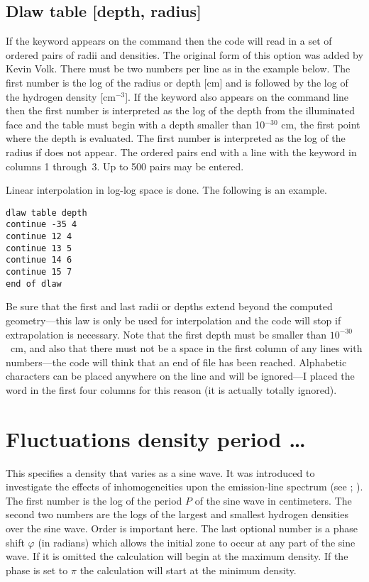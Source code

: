 \subsection{Dlaw table [depth, radius]}

If the keyword  appears on the 
command then the code will read
in a set of ordered pairs of radii and densities.
The original form of
this option was added by Kevin Volk.
There must be two numbers per line
as in the example below.
The first number is the log of the radius or depth
[cm] and is followed by the log of the hydrogen density [cm$^{-3}$].
If the
keyword  also appears on the command line then
the first number is
interpreted as the log of the depth from the illuminated face
and the table
must begin with a depth smaller than 10$^{-30}$ cm,
the first point where the
depth is evaluated.
The first number is interpreted as the log of the radius
if  does not appear.
The ordered pairs end with a line with the keyword
 in columns 1 through~3.  Up to 500 pairs may be entered.

Linear interpolation in log-log space is done.
The following is an example.
\begin{verbatim}
dlaw table depth
continue -35 4
continue 12 4
continue 13 5
continue 14 6
continue 15 7
end of dlaw
\end{verbatim}

Be sure that the first and last radii or depths extend beyond the computed
geometry---this law is only be used for interpolation and the code will
stop if extrapolation is necessary.
Note that the first depth must be
smaller than $10^{-30}$~cm,
and also that there must not be a space in the first
column of any lines with numbers---the code will think that an end of file
has been reached.
Alphabetic characters can be placed anywhere on the line
and will be ignored---I placed the word
 in the first four columns
for this reason (it is actually totally ignored).

\section{Fluctuations density period \dots}

This specifies a density that varies as a sine wave.  It was introduced
to investigate the effects of inhomogeneities upon the
emission-line spectrum
(see \citealp{Mihalszki1983}; \citealp{KingdonFerland1995}).
The first number
is the log of the period $P$ of the sine wave in centimeters.
The second
two numbers are the logs of the largest and smallest hydrogen densities
over the sine wave.  Order is important here.
The last optional number
is a phase shift $\varphi$ (in radians) which allows the initial zone to occur at
any part of the sine wave.
If it is omitted the calculation will begin
at the maximum density.
If the phase is set to $\pi$ the calculation will start
at the minimum density.

